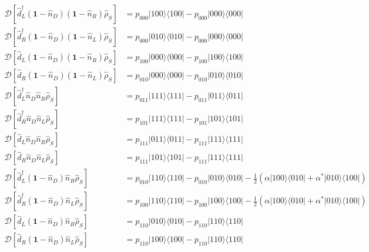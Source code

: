 \begin{appendixs}
\begin{align*}
    \mathcal{D}[\hat{d}^{\dagger}_{L}(\textbf{1}-\hat{n}_{D})(\textbf{1}-\hat{n}_{R})\hat{\rho}_{S}] & = p_{000}|100\rangle \langle 100| - p_{000}|000\rangle \langle 000| \\ 
    \mathcal{D}[\hat{d}^{\dagger}_{R}(\textbf{1}-\hat{n}_{D})(\textbf{1}-\hat{n}_{L})\hat{\rho}_{S}] & = p_{000}|010\rangle \langle 010| - p_{000}|000\rangle \langle 000| \\  
    \mathcal{D}[\hat{d}_{L}(\textbf{1}-\hat{n}_{D})(\textbf{1}-\hat{n}_{R})\hat{\rho}_{S}] & = p_{100}|000\rangle \langle 000| - p_{100}|100\rangle \langle 100|\\ 
    \mathcal{D}[\hat{d}_{R}(\textbf{1}-\hat{n}_{D})(\textbf{1}-\hat{n}_{L})\hat{\rho}_{S}] & = p_{010}|000\rangle \langle 000| - p_{010}|010\rangle \langle 010| \\ 
    \mathcal{D}[\hat{d}^{\dagger}_{L}\hat{n}_{D} \hat{n}_{R}\hat{\rho}_{S}] & = p_{011}|111\rangle \langle 111| - p_{011}|011\rangle \langle 011| \\  
    \mathcal{D}[\hat{d}^{\dagger}_{R} \hat{n}_{D}\hat{n}_{L}\hat{\rho}_{S}] & = p_{101}|111\rangle \langle 111| - p_{101}|101\rangle \langle 101| \\ 
     \mathcal{D}[\hat{d}_{L}\hat{n}_{D}\hat{n}_{R}\hat{\rho}_{S}] & = p_{111}|011\rangle \langle 011| - p_{111}|111\rangle \langle 111|  \\    
      \mathcal{D}[\hat{d}_{R}\hat{n}_{D}\hat{n}_{L}\hat{\rho}_{S}] & = p_{111}|101\rangle \langle 101| - p_{111}|111\rangle \langle 111|  \\ 
    \mathcal{D}[\hat{d}^{\dagger}_{L}(\textbf{1}-\hat{n}_{D})\hat{n}_{R}\hat{\rho}_{S}] & = p_{010}|110\rangle \langle 110| - p_{010}|010\rangle \langle 010| - \frac{1}{2}( \alpha|100\rangle \langle 010| + \alpha^{*}|010\rangle \langle 100|) \\ 
    \mathcal{D}[\hat{d}^{\dagger}_{R}(\textbf{1}-\hat{n}_{D})\hat{n}_{L}\hat{\rho}_{S}] & = p_{100}|110\rangle \langle 110| - p_{100}|100\rangle \langle 100| - \frac{1}{2}( \alpha |100\rangle \langle 010| + \alpha^{*}|010\rangle \langle 100| )  \\  
    \mathcal{D}[\hat{d}_{L}(\textbf{1}-\hat{n}_{D})\hat{n}_{R}\hat{\rho}_{S}] & = p_{110}|010\rangle \langle 010| - p_{110}|110\rangle \langle 110| \\ 
    \mathcal{D}[\hat{d}_{R}(\textbf{1}-\hat{n}_{D})\hat{n}_{L}\hat{\rho}_{S}] & = p_{110}|100\rangle \langle 100| - p_{110}|110\rangle \langle 110| \\  

\end{align*}
\end{appendixs}
